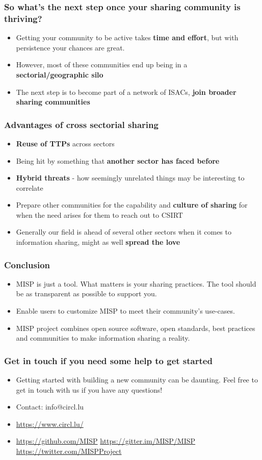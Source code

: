 \begin{frame}
\frametitle{So what's the next step once your sharing community is thriving?}
\begin{itemize}
	\item Getting your community to be active takes {\bf time and effort}, but with persistence your chances are great.
	\item However, most of these communities end up being in a {\bf sectorial/geographic silo}
	\item The next step is to become part of a network of ISACs, {\bf join broader sharing communities}
\end{itemize}
\end{frame}

\begin{frame}
\frametitle{Advantages of cross sectorial sharing}
\begin{itemize}
	\item {\bf Reuse of TTPs} across sectors
	\item Being hit by something that {\bf another sector has faced before}
	\item {\bf Hybrid threats} - how seemingly unrelated things may be interesting to correlate
	\item Prepare other communities for the capability and {\bf culture of sharing} for when the need arises for them to reach out to CSIRT
	\item Generally our field is ahead of several other sectors when it comes to information sharing, might as well {\bf spread the love}
\end{itemize}
\end{frame}


\begin{frame}
        \frametitle{Conclusion}
        \begin{itemize}
                \item MISP is just a tool. What matters is your sharing practices. The tool should be as transparent as possible to support you.
                \item Enable users to customize MISP to meet their community's use-cases.
                \item MISP project combines open source software, open standards, best practices and communities to make information sharing a reality.
        \end{itemize}
\end{frame}

\begin{frame}
\frametitle{Get in touch if you need some help to get started}
\begin{itemize}
\item Getting started with building a new community can be daunting. Feel free to get in touch with us if you have any questions!
\item Contact: info@circl.lu
\item \url{https://www.circl.lu/}
\item \url{https://github.com/MISP}  \url{https://gitter.im/MISP/MISP}  \url{https://twitter.com/MISPProject}
\end{itemize}
\end{frame}

